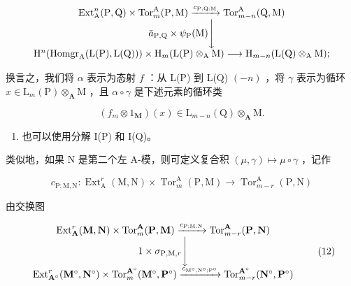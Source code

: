 \[
\begin{array}{c} \operatorname{Ext} _ {\mathrm{A}} ^ {n} (\mathrm{P}, \mathrm{Q}) \times \operatorname{Tor} _ {m} ^ {\mathrm{A}} (\mathrm{P}, \mathrm{M}) \xrightarrow {c _ {\mathrm{P} , \mathrm{Q} : \mathrm{M}}} \operatorname{Tor} _ {m - n} ^ {\mathrm{A}} (\mathrm{Q}, \mathrm{M}) \\ \bar {a} _ {\mathrm{P}, \mathrm{Q}} \times \psi_ {\mathrm{P}} (\mathrm{M}) \Biggl \downarrow \\ \mathrm{H} ^ {n} (\operatorname{Homgr} _ {\mathrm{A}} (\mathrm{L} (\mathrm{P}), \mathrm{L} (\mathrm{Q}))) \times \mathrm{H} _ {m} (\mathrm{L} (\mathrm{P}) \otimes_ {\mathrm{A}} \mathrm{M}) \longrightarrow \mathrm{H} _ {m - n} (\mathrm{L} (\mathrm{Q}) \otimes_ {\mathrm{A}} \mathrm{M}); \end{array}
\]

换言之，我们将 \(\alpha\) 表示为态射 \(f\) ：从 L(P) 到 L(Q) \((-n)\) ，将 \(\gamma\) 表示为循环 \(x \in \mathrm{L}_{m}(\mathrm{P}) \otimes_{\mathbf{A}} \mathrm{M}\) ，且 \(\alpha \circ \gamma\) 是下述元素的循环类

\[
\left(f _ {m} \otimes 1 _ {\mathbf {M}}\right) (x) \in \mathrm{L} _ {m - n} (\mathrm{Q}) \otimes_ {\mathbf {A}} \mathrm{M}.
\]

\begin{enumerate}
\def\labelenumi{\arabic{enumi})}
\setcounter{enumi}{1}
\tightlist
\item
  也可以使用分解 I(P) 和 I(Q)。
\end{enumerate}

类似地，如果 N 是第二个左 A-模，则可定义复合积 \((\mu, \gamma) \mapsto \mu \circ \gamma\) ，记作

\[
c _ {\mathrm{P}; \mathrm{M}, \mathrm{N}}: \operatorname{Ext} _ {\mathrm{A}} ^ {r} (\mathrm{M}, \mathrm{N}) \times \operatorname{Tor} _ {m} ^ {\mathrm{A}} (\mathrm{P}, \mathrm{M}) \rightarrow \operatorname{Tor} _ {m - r} ^ {\mathrm{A}} (\mathrm{P}, \mathrm{N})
\]

由交换图

\[
\begin{array}{c} \operatorname{Ext} _ {\mathbf {A}} ^ {r} (\mathbf {M}, \mathbf {N}) \times \operatorname{Tor} _ {m} ^ {\mathbf {A}} (\mathbf {P}, \mathbf {M}) \xrightarrow {c _ {\mathrm{P} ; \mathrm{M} , \mathrm{N}}} \operatorname{Tor} _ {m - r} ^ {\mathbf {A}} (\mathbf {P}, \mathbf {N}) \\ 1 \times \sigma_ {\mathrm{P}, \mathrm{M}, r} \Biggl \downarrow \\ \operatorname{Ext} _ {\mathbf {A} ^ {\circ}} ^ {r} (\mathbf {M} ^ {\circ}, \mathbf {N} ^ {\circ}) \times \operatorname{Tor} _ {m} ^ {\mathbf {A} ^ {\circ}} (\mathbf {M} ^ {\circ}, \mathbf {P} ^ {\circ}) \xrightarrow {c _ {\mathrm{M} ^ {\circ} , \mathrm{N} ^ {\circ} ; \mathrm{P} ^ {\circ}}} \operatorname{Tor} _ {m - r} ^ {\mathbf {A} ^ {\circ}} (\mathbf {N} ^ {\circ}, \mathbf {P} ^ {\circ}) \end{array}\tag{12}
\]


